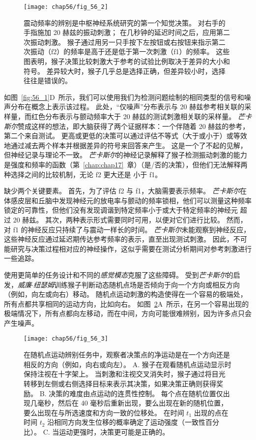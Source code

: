\begin{figure}[htbp]
	\centering
	\texttt{[image: chap56/fig\_56\_2]}
	\caption{震动频率的辨别是中枢神经系统研究的第一个知觉决策。
		对右手的手指施加 20 赫兹的振动刺激；
		在几秒钟的延迟时间之后，应用第二次振动刺激。
		猴子通过用另一只手按下左按钮或右按钮来指示第二次振动（f2）的频率是高于还是低于第一次刺激（f1）的频率。
		这些图表明，猴子决策比较刺激大于参考的试验比例取决于差异的大小和符号。
		差异较大时，猴子几乎总是选择正确，但差异较小时，选择往往是错误的\cite{romo2001touch}。}
	\label{fig:56_2}
\end{figure}


如图~\ref{fig:56_1}D~所示，我们可以使用我们为检测问题绘制的相同类型的信号和噪声分布在概念上表示该过程。
此处，“仅噪声”分布表示与 20 赫兹参考相关联的采样量，而红色分布表示与颤动频率大于 20 赫兹的测试刺激相关联的采样量。
\textit{芒卡斯尔}赞成这样的想法，即大脑获得了两个证据样本：一个伴随着 20 赫兹的参考，第二个来自测试。
更高或更低的决策可以通过评估不等式（大于或小于）或等效地通过减去两个样本并根据差异的符号来回答来产生。
这是一个了不起的见解，但神经记录与理论不一致。
\textit{芒卡斯尔}的神经记录解释了猴子检测振动刺激的能力是强度和频率的函数（第~\ref{chap:chap17}~章）（是/否的决策），但他们无法解释两种选择之间的比较机制，无论 f2 更大还是 小于 f1。


缺少两个关键要素。
首先，为了评估 f2 与 f1，大脑需要表示频率。
\textit{芒卡斯尔}在体感皮层和丘脑中发现神经元的放电率与颤动的频率锁相，他们可以测量这种频率锁定的可靠性，但他们没有发现调谐到特定频率小于或大于特定频率的神经元 超过 20 赫兹。
其次，两种表示形式需要同时可用，以便对它们进行比较。
然而，对 f1 的神经反应只持续了与震动一样长的时间。
\textit{芒卡斯尔}未能观察到神经反应，这些神经反应通过延迟期传达参考频率的表示，直至出现测试刺激。
因此，不可能研究与决策过程相对应的神经操作，这似乎需要在测试分析期间对参考刺激进行一些追踪。


使用更简单的任务设计和不同的\textit{感觉模态}克服了这些障碍。
受到\textit{芒卡斯尔}的启发，\textit{威廉$\cdot$纽瑟姆}训练猴子判断动态随机点场是否倾向于向一个方向或相反方向（例如，向左或向右）移动。
随机点运动刺激的构造使得在一个容易的极端处，所有点都共享相同的运动方向，比如向右。
如图~\ref{fig:56_3}A~所示，在另一个容易出现的极端情况下，所有点都向左移动，而在中间，方向可能很难辨别，因为许多点只会产生噪声。


\begin{figure}[htbp]
	\centering
	\texttt{[image: chap56/fig\_56\_3]}
	\caption{在随机点运动辨别任务中，观察者决策点的净运动是在一个方向还是相反的方向（例如，向右或向左）。
		A. 猴子在观看随机点运动显示时保持注视在十字架上。
		当刺激和注视交叉消失时，猴子通过将目光转移到左侧或右侧选择目标来表示其决策，如果决策正确则获得奖励。
		B. 决策的难度由点运动的连贯性控制。
		每个点在随机位置仅出现几毫秒，然后在 40 毫秒后重新出现，要么出现在新的随机位置，要么出现在与所选速度和方向一致的位移处。
		在时间 $t_1$ 出现的点在时间 $t_2$ 沿相同方向发生位移的概率确定了运动强度（一致性百分比）\cite{britten1992analysis}。
		C. 当运动更强时，决策更可能是正确的。}
	\label{fig:56_3}
\end{figure}



